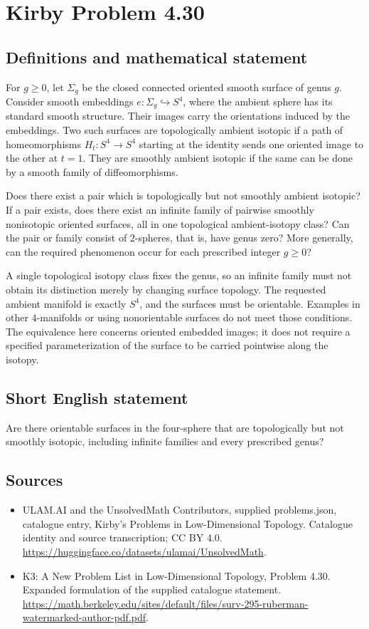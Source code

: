 \documentclass[11pt,a4paper]{article}
\begin{document}
\section*{Kirby Problem 4.30}\label{statement}

\subsection{Definitions and mathematical statement}
For $g\ge0$, let $\Sigma_g$ be the closed connected oriented smooth
surface of genus $g$. Consider smooth embeddings $e:\Sigma_g\hookrightarrow
S^4$, where the ambient sphere has its standard smooth structure.
Their images carry the orientations induced by the embeddings.
Two such surfaces are topologically ambient isotopic if a path of
homeomorphisms $H_t:S^4\to S^4$ starting at the identity sends one
oriented image to the other at $t=1$. They are smoothly ambient
isotopic if the same can be done by a smooth family of diffeomorphisms.

Does there exist a pair which is topologically but not smoothly
ambient isotopic? If a pair exists, does there exist an infinite
family of pairwise smoothly nonisotopic oriented surfaces, all in one
topological ambient-isotopy class? Can the pair or family consist of
$2$-spheres, that is, have genus zero? More generally, can the required
phenomenon occur for each prescribed integer $g\ge0$?

A single topological isotopy class fixes the genus, so an infinite
family must not obtain its distinction merely by changing surface
topology. The requested ambient manifold is exactly $S^4$, and the
surfaces must be orientable. Examples in other $4$-manifolds or using
nonorientable surfaces do not meet those conditions.
The equivalence here concerns oriented embedded images; it does not
require a specified parameterization of the surface to be carried
pointwise along the isotopy.
\subsection{Short English statement}
Are there orientable surfaces in the four-sphere that are topologically but not smoothly isotopic, including infinite families and every prescribed genus?
\subsection{Sources}
\begin{itemize}
\item[S1] ULAM.AI and the UnsolvedMath Contributors, supplied problems.json, catalogue entry, Kirby's Problems in Low-Dimensional Topology. Catalogue identity and source transcription; CC BY 4.0.
\url{https://huggingface.co/datasets/ulamai/UnsolvedMath}.
\item[S2] K3: A New Problem List in Low-Dimensional Topology, Problem 4.30. Expanded formulation of the supplied catalogue statement.
\url{https://math.berkeley.edu/sites/default/files/surv-295-ruberman-watermarked-author-pdf.pdf}.
\end{itemize}
\end{document}
